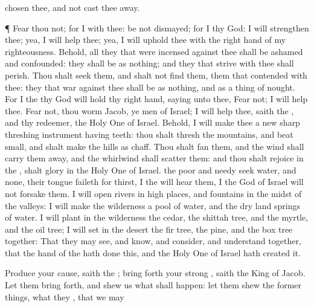 {chosen thee, and not cast thee
away.
\par }{\PP {}¶
Fear thou not; for I
{} with thee: be not
dismayed; for I
{} thy
God: I will
strengthen thee; yea, I will
help thee; yea, I will
uphold thee with the right
hand of my
righteousness.
Behold, all they that were
incensed against thee shall be
ashamed and
confounded: they shall be as nothing; and
they that
strive with thee shall
perish.
Thou shalt
seek them, and shalt not
find them,
{}
them that
contended with thee: they that
war against thee shall be as nothing, and as a thing of
nought.
For I the
{} thy
God will
hold thy right
hand,
saying unto thee,
Fear not; I will
help thee.
Fear not, thou
worm
Jacob,
{} ye
men of
Israel; I will
help thee,
saith the
{}, and thy
redeemer, the Holy
One of
Israel.
Behold, I will
make thee a
new
sharp
threshing instrument
having
teeth: thou shalt
thresh the
mountains, and beat
{}
small, and shalt
make the
hills as
chaff.
Thou shalt
fan them, and the
wind shall carry them
away, and the
whirlwind shall
scatter them: and thou shalt
rejoice in the
{},
{} shalt
glory in the Holy
One of
Israel.
 the
poor and
needy
seek
water, and
{} none,
{} their
tongue
faileth for
thirst, I the
{} will
hear them, I the
God of
Israel will not
forsake them.
I will
open
rivers in high
places, and
fountains in the
midst of the
valleys: I will
make the
wilderness a
pool of
water, and the
dry
land
springs of
water.
I will
plant in the
wilderness the
cedar, the shittah
tree, and the
myrtle, and the
oil
tree; I will
set in the
desert the fir
tree,
{} the
pine, and the box
tree
together:
That they may
see, and
know, and
consider, and
understand
together, that the
hand of the
{} hath
done this, and the Holy
One of
Israel hath
created it.
\par }{\PP {}Produce your
cause,
saith the
{}; bring
forth your
strong
{},
saith the
King of
Jacob.
Let them bring
{}
forth, and
shew us what shall
happen: let them
shew the former
things, what they
{}, that we may
}
